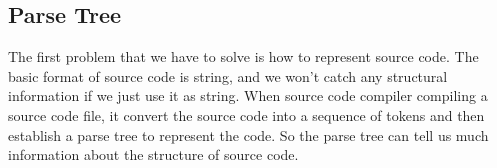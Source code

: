
\subsection{Parse Tree}



The first problem that we have to solve is how to represent source code. The basic format of source code is string, and we won't catch any structural information if we just use it as string. When source code compiler compiling a source code file, it convert the source code into a sequence of tokens and then establish a parse tree to represent the code. So the parse tree can tell us much information about the structure of source code.
